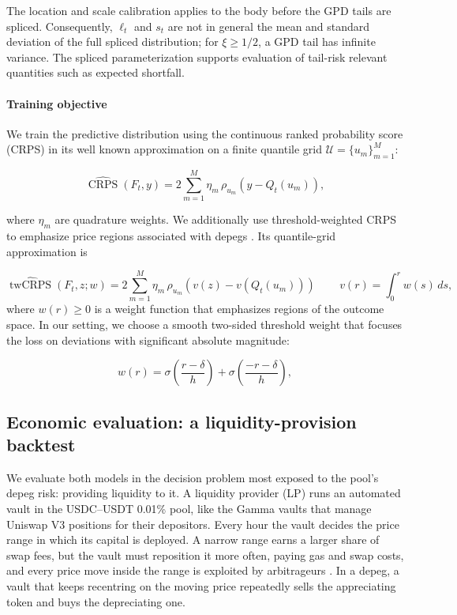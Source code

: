 \documentclass[a4paper,fleqn]{cas-sc}
\begin{document}
The location and scale calibration applies to the body before the GPD tails are spliced. Consequently, $\ell_t$ and $s_t$ are not in general the mean and standard deviation of the full spliced distribution; for $\xi\geq 1/2$, a GPD tail has infinite variance. The spliced parameterization supports evaluation of tail-risk relevant quantities such as expected shortfall.

\paragraph{Training objective}

We train the predictive distribution using the continuous ranked probability score (CRPS) \citep{CRPS} in its well known approximation on a finite quantile grid $\mathcal{U}=\{u_m\}_{m=1}^{M}$:

\begin{equation} \widehat{\operatorname{CRPS}}(F_t,y)=
2\sum_{m=1}^{M} \eta_m\, \rho_{u_m}\left(y-Q_t(u_m)\right), \end{equation}

where $\eta_m$ are quadrature weights. We additionally use threshold-weighted CRPS to emphasize price regions associated with depegs \citep{twCRPS}. Its quantile-grid approximation is 

\begin{equation} \widehat{\operatorname{twCRPS}}(F_t,z; w)=
2\sum_{m=1}^{M}
\eta_m\,
\rho_{u_m}
\left(
v(z)-v(Q_t(u_m))
\right)\,
\qquad
v(r)=\int_{0}^{r} w(s)\,ds,
\end{equation}
where $w(r)\geq 0$ is a weight function that emphasizes regions of the outcome space. In our setting, we choose a smooth two-sided threshold weight that focuses the loss on deviations with significant absolute magnitude:

\begin{equation}
w(r)
=
\sigma\!\left(\frac{r-\delta}{h}\right)
+
\sigma\!\left(\frac{-r-\delta}{h}\right),
\end{equation}



\subsection{Economic evaluation: a liquidity-provision backtest}\label{sec:lp_method}

We evaluate both models in the decision problem most exposed to the pool's depeg risk: providing liquidity
to it. A liquidity provider (LP) runs an automated vault in the USDC--USDT 0.01\% pool, like the Gamma vaults
that manage Uniswap V3 positions for their depositors. Every hour the vault decides the price range in which
its capital is deployed. A narrow range earns a larger share of swap fees, but the vault must reposition it
more often, paying gas and swap costs, and every price move inside the range is exploited by arbitrageurs
\citep{Milionis2022}. In a depeg, a vault that keeps recentring on the moving price repeatedly sells the
appreciating token and buys the depreciating one.
\end{document}
